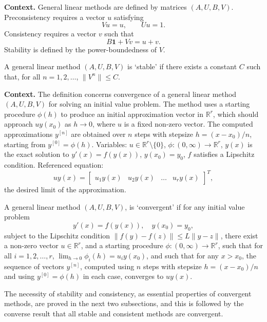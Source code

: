 \noindent\textbf{Context.}
General linear methods are defined by matrices $(A,U,B,V)$.
Preconsistency requires a vector $u$ satisfying
\begin{equation}
V u = u, \qquad U u = 1.
\end{equation}
Consistency requires a vector $v$ such that
\begin{equation}
B\mathbf{1} + V v = u + v.
\end{equation}
Stability is defined by the power-boundedness of $V$.

\begin{definition}[stable (510C)]

  \label{def:510C}
A general linear method $(A, U, B, V)$ is `stable' if there exists a constant $C$ such that, for all $n = 1, 2, \dots$, $\|V^n\| \leq C$.
\end{definition}

\noindent\textbf{Context.}
The definition concerns convergence of a general linear method $(A, U, B, V)$ for solving an initial value problem. The method uses a starting procedure $\phi(h)$ to produce an initial approximation vector in $\mathbb{R}^r$, which should approach $u y(x_0)$ as $h\to0$, where $u$ is a fixed non-zero vector. The computed approximations $y^{[n]}$ are obtained over $n$ steps with stepsize $h = (x - x_0)/n$, starting from $y^{[0]} = \phi(h)$. Variables: $u\in\mathbb{R}^r\setminus\{0\}$, $\phi:(0,\infty)\to\mathbb{R}^r$, $y(x)$ is the exact solution to $y'(x)=f(y(x))$, $y(x_0)=y_0$, $f$ satisfies a Lipschitz condition. Referenced equation:
\begin{equation}
u y(x) = \begin{bmatrix} u_1 y(x) & u_2 y(x) & \dots & u_r y(x) \end{bmatrix}^T,
\end{equation}
the desired limit of the approximation.

\begin{definition}

  \label{def:512A}
A general linear method $(A, U, B, V)$, is `convergent' if for any initial value problem
\[
y'(x) = f(y(x)), \quad y(x_0) = y_0,
\]
subject to the Lipschitz condition $\|f(y) - f(z)\| \leq L \|y - z\|$, there exist a non-zero vector $u \in \mathbb{R}^r$, and a starting procedure $\phi : (0, \infty) \to \mathbb{R}^r$, such that for all $i = 1, 2, \dots, r$, $\lim_{h \to 0} \phi_i(h) = u_i y(x_0)$, and such that for any $x > x_0$, the sequence of vectors $y^{[n]}$, computed using $n$ steps with stepsize $h = (x - x_0)/n$ and using $y^{[0]} = \phi(h)$ in each case, converges to $u y(x)$.

The necessity of stability and consistency, as essential properties of convergent methods, are proved in the next two subsections, and this is followed by the converse result that all stable and consistent methods are convergent.
\end{definition}

